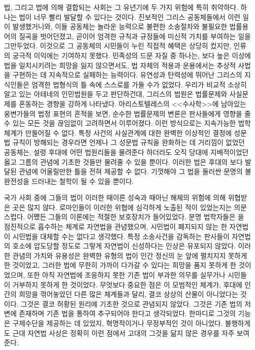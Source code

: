 법, 그리고 법에 의해 결합되는 사회는 그 유년기에
두 가지 위험에 특히 취약하다.
하나는 법이 너무 빨리 발달할 수 있다는 것이다.
진보적인 그리스 공동체들에서 이런 일이 발생했거니와,
이들 공동체는 놀라운 능력으로 불편한 소송절차와 불필요한 법률용어의
질곡을 벗어던졌고, 곧이어 엄격한 규칙과 규정들에 미신적 가치를 부여하는 일을
그만두었다.
이것으로 그 공동체의 시민들이 누린 직접적 혜택은 상당히 컸지만,
인류의 궁극적 이익에는 기여하지 못했다.
민족성의 드문 자질 중 하나는,
보다 높은 이상에 법을 일치시키려는 희망을 잃지 않으면서도,
법 자체의 적용과 운용에서는
추상적 사법을 구현하는 데 지속적으로 실패하는 능력이다.
유연성과 탄력성에 뛰어난
그리스의 지식인들은
엄격한 법형식의 틀 속에 스스로를 가둘 수가 없었다.
우리가 비교적 소상히 알고 있는 아테네의 인민법원을 두고 판단하건대,
그리스의 법원은 법률문제와 사실문제를 혼동하는 경향을 강하게 나타냈다.
아리스토텔레스의 <<수사학>>에 남아있는
웅변가들의 법정 표현의 흔적을 보면,
순수한 법률문제의 변론은
판사들에게 영향을 줄 수 있는 모든 것을 끊임없이 고려하면서 이루어졌다.
이런 방식으로는 지속가능한 법학체계가 만들어질 수 없다.
특정 사건의 사실관계에 대한 완벽한 이상적인 결정에 성문법 규칙이 방해되는
경우라면 언제나 그 성문법 규칙을 완화하는 데 거리낌이 없었던 공동체는,
설령 후대에 어떤 법원리들을 물려준다 하더라도
오직 당대에 지배적이었던 옳고 그름의 관념에 기초한 것들만 물려줄 수 있을 뿐이다.
이러한 법은 후대의 보다 발달된 관념에 어울릴만한 틀을 전혀 제공할 수 없다.
기껏해야 그 법을 둘러싼 문명의 볼완전성을 드러내는 철학이 될 수 있을 뿐이다.

국가 사회 중에 그들의 법이
이러한 때이른 성숙과 때아닌 해체의 위험에 의해 위협받은 곳은 많지 않다.
로마인들이 이러한 위협에 심각하게 노출된 적이 있었는지는 의문스럽다.
어쨌든 그들의  이론에는 적절한 보호장치가 들어있었다.
분명 법학자들은 을 점진적으로 흡수하는 체계로 자연법을 관념했으며,
시민법이 폐지되지 않는 한 자연법이 시민법을 대체할 수는 없다고 생각했다.
특정 소송사건을 감독하는 판사들이 자연법의 호소에 압도당할 정도로
그렇게 자연법이 신성하다는 인상은 유포되지 않았다.
이러한 관념의 가치와 유용성은 완벽한 유형의 법이 인간 정신의 눈 앞에
펼치지지 못하게 한 것이었고, 그러한 법에 무한히 가까이 다가갈 수 있다는
희망을 품지 못하게 한 것이었으며, 또한 아직 자연법에 조응하지 못한
기존 법이 부과한 의무를 실무가나 시민들이 거부하지 못하게 한 것이었다.
무엇보다 중요한 점은 이 모범적인 체계가,
후대에 인간의 희망을 꺾어놓았던 다른 많은 체계들과 달리,
결코 상상의 산물이 아니었다는 것이다.
그것은 결코 허황된 원리에 기초한 것으로 관념되지 않았다.
그것은 기존 법의 저변에 존재하며 기존 법을 통하여 추구되어야 한다고 생각되었다.
한마디로 그것의 기능은 구제수단을 제공하는 데 있었지, 혁명적이거나
무정부적인 것이 아니었다.
불행하게도 근대 자연법 사상은
정확히 이런 점에서
고대의 그것을
닮지 않은 경우를 자주 보여준다.

